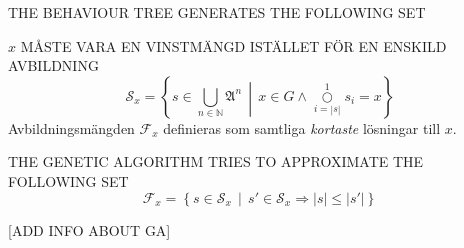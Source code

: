 \documentclass[10pt,a4paper]{article}
\begin{document}
THE BEHAVIOUR TREE GENERATES THE FOLLOWING SET

\(x\) MÅSTE VARA EN VINSTMÄNGD ISTÄLLET FÖR EN ENSKILD AVBILDNING
\begin{equation}
		\mathscr{S}_x = \left\{ s \in \bigcup_{n\in \mathbb{N}}\mathfrak{A}^n \,\middle|\, x\in G\wedge\overset{1}{\underset{i=|s|}\bigcirc} s_i = x \right\}
\end{equation}
Avbildningsmängden \(\mathscr{F}_x\) definieras som samtliga \textit{kortaste} lösningar till \(x\).

THE GENETIC ALGORITHM TRIES TO APPROXIMATE THE FOLLOWING SET \begin{equation}
		\mathscr{F}_x=\left\{s\in\mathscr{S}_x \,\middle|\, s'\in \mathscr{S}_x \Rightarrow |s|\le|s'|\right\}
\end{equation}

[ADD INFO ABOUT GA]
\end{document}
